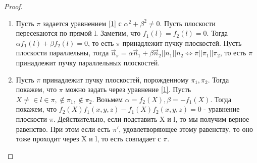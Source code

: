 \begin{proof}
	\begin{enumerate}
		\item Пусть $\pi$ задается уравнением \ref{1} с \(\alpha^2+\beta^2\ne0\). \newline Пусть плоскости пересекаются по прямой l. Заметим, что \(f_1(l) = f_2(l) = 0\). Тогда $\alpha f_1(l) + \beta f_2(l) = 0$, то есть $\pi$ принадлежит пучку плоскостей. \newline
		Пусть плоскости параллельны, тогда \(\vec n_\pi = \alpha\vec n_1 + \beta\vec n_2 || n_1 || n_2\Longleftrightarrow \pi || \pi_1 || \pi_2\), то есть $\pi$ принадлежит пучку параллельных плоскостей.
		\item Пусть $\pi$ принадлежит пучку плоскостей, порожденному $\pi_1, \pi_2$. Тогда покажем, что $\pi$ можно задать через уравнение \ref{1}. Пусть \(X\ne\in l\in \pi, \not\in \pi_1,\not\in\pi_2\). Возьмем \(\alpha=f_2(X), \beta = -f_1(X)\). Тогда покажем, что \(f_2(X)f_1(x,y,z) -f_1(X)f_2(x,y,z) = 0\) - уравнение плоскости $\pi$. Действительно, если подставить X и l, то мы получим верное равенство. При этом если есть $\pi'$, удовлетворяющее этому равенству, то оно тоже проходит через X и l, то есть совпадает с $\pi$.
 	\end{enumerate}
\end{proof}
